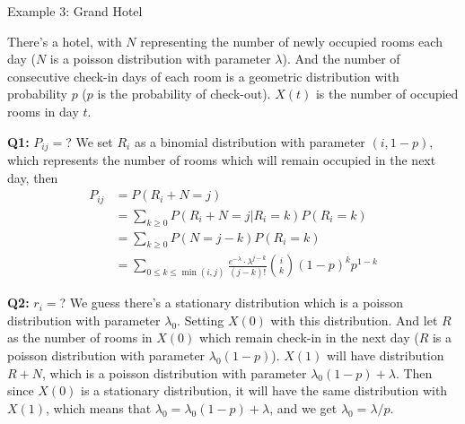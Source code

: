 \documentclass{beamer}
\begin{document}
\begin{frame}{Example 3: Grand Hotel}
	\begin{example}
	There's a hotel, with $N$ representing the number of newly occupied rooms each day ($N$ is a poisson distribution with parameter $\lambda$).
	And the number of consecutive check-in days of each room is a geometric distribution with probability $p$ ($p$ is the probability of check-out).
	$X(t)$ is the number of occupied rooms in day $t$.
	\end{example}
\end{frame}

\begin{frame}{\textbf{Q1:} $P_{ij} = $?}
	We set $R_i$ as a binomial distribution with parameter $(i, 1-p)$, which represents the number of rooms which will remain occupied in the next day, then
	\begin{align*}
	P_{ij} & = P(R_i + N = j) \\
	& = \sum_{k\geq 0} P(R_i + N = j | R_i = k)P(R_i = k) \\
	& = \sum_{k\geq 0} P(N = j-k)P(R_i = k) \\
	& = \sum_{0 \leq k \leq \min(i,j)} \frac{e^{-\lambda}\cdot \lambda^{j-k}}{(j-k)!} \binom{i}{k} (1-p)^k p^{1-k}
	\end{align*}
\end{frame}

\begin{frame}{\textbf{Q2:} $r_i =$?}
	We guess there's a stationary distribution which is a poisson distribution with parameter $\lambda_0$.
	Setting $X(0)$ with this distribution. 
	And let $R$ as the number of rooms in $X(0)$ which remain check-in in the next day ($R$ is a poisson distribution with parameter $\lambda_0 (1-p)$).
	$X(1)$ will have distribution $R + N$, which is a poisson distribution with parameter $\lambda_0 (1-p) + \lambda$.
	Then since $X(0)$ is a stationary distribution, it will have the same distribution with $X(1)$, which means that $\lambda_0 = \lambda_0 (1-p) + \lambda$, and we get $\lambda_0 = \lambda / p$.
\end{frame}
\end{document}
